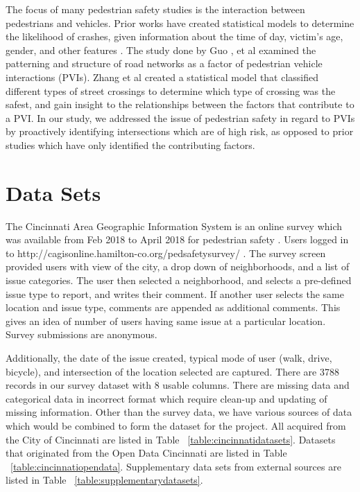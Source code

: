 \documentclass{llncs}
\begin{document}
The focus of many pedestrian safety studies is the interaction between pedestrians and vehicles. Prior works have created statistical models to determine the likelihood of crashes, given information about the time of day, victim's age, gender, and other features \cite{brude1993models} \cite{lascala2000demographic} \cite{lyon2002pedestrian} \cite{ladron2004forecasting} \cite{pulugurtha2011pedestrian} \cite{ukkusuri2011random}. The study done by Guo \cite{guo2017effect}, et al examined the patterning and structure of road networks as a factor of pedestrian vehicle interactions (PVIs). Zhang et al \cite{zhang2017quantitative} created a statistical model that classified different types of street crossings to determine which type of crossing was the safest, and gain insight to the relationships between the factors that contribute to a PVI. In our study, we addressed the issue of pedestrian safety in regard to PVIs by proactively identifying intersections which are of high risk, as opposed to prior studies which have only identified the contributing factors.


\section{Data Sets}
%
%
The Cincinnati Area Geographic Information System is an online survey which was available from Feb 2018 to April 2018 for pedestrian safety \cite{cvg2018city}. Users logged in to http://cagisonline.hamilton-co.org/pedsafetysurvey/ . The survey screen provided users with view of the city, a drop down of neighborhoods, and a list of issue categories. The user then selected a neighborhood, and selects a pre-defined issue type to report, and writes their comment. If another user selects the same location and issue type, comments are appended as additional comments. This gives an idea of number of users having same issue at a particular location. Survey submissions are anonymous.

Additionally, the date of the issue created, typical mode of user (walk, drive, bicycle), and intersection of the location selected are captured. There are 3788 records in our survey dataset with 8 usable columns. There are missing data and categorical data in incorrect format which require clean-up and updating of missing information. Other than the survey data, we have various sources of data which would be combined to form the dataset for the project. All acquired from the City of Cincinnati are listed in Table ~\ref{table:cincinnatidatasets}. Datasets that originated from the Open Data Cincinnati are listed in Table ~\ref{table:cincinnatiopendata}.  Supplementary data sets from external sources are listed in Table ~\ref{table:supplementarydatasets}.
\end{document}
